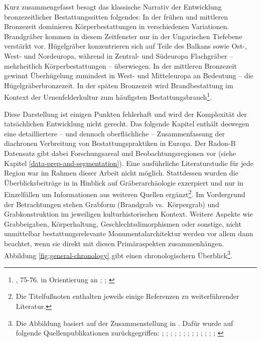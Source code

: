 \documentclass[openany,twoside,twocolumn]{book}
\let\rmarkdownfootnote\footnote%
\def\footnote{\protect\rmarkdownfootnote}
\begin{document}
Kurz zusammengefasst besagt das klassische Narrativ der Entwicklung
bronzezeitlicher Bestattungssitten folgendes: In der frühen und
mittleren Bronzezeit dominieren Körperbestattungen in verschiedenen
Variationen. Brandgräber kommen in diesem Zeitfenster nur in der
Ungarischen Tiefebene verstärkt vor. Hügelgräber konzentrieren sich auf
Teile des Balkans sowie Ost-, West- und Nordeuropa, während in Zentral-
und Südeuropa Flachgräber -- mehrheitlich Körperbestattungen --
überwiegen. In der mittleren Bronzezeit gewinnt Überhügelung zumindest
in West- und Mitteleuropa an Bedeutung -- die Hügelgräberbronzezeit. In
der späten Bronzezeit wird Brandbestattung im Kontext der
Urnenfelderkultur zum häufigsten Bestattungsbrauch\footnote{\textcite{harding_european_2000},
  75-76. in Orientierung an \textcite{hausler_bestattungssitten_1977};
  \textcite{hausler_grab-_1994};
  \textcite{hausler_totenorientierung_1996}}.

Diese Darstellung ist einigen Punkten fehlerhaft und wird der
Komplexität der tatsächlichen Entwicklung nicht gerecht. Das folgende
Kapitel enthält deswegen eine detailliertere -- und dennoch
oberflächliche -- Zusammenfassung der diachronen Verbreitung von
Bestattungspraktiken in Europa. Der Radon-B Datensatz gibt dabei
Forschungsareal und Beobachtungsregionen vor (siehe Kapitel
\ref{data-prep-and-segmentation}). Eine ausführliche Literaturstudie für
jede Region war im Rahmen dieser Arbeit nicht möglich. Stattdessen
wurden die Überblicksbeiträge in \textcite{fokkens_oxford_2013} in
Hinblick auf Gräberarchäologie exzerpiert und nur in Einzelfällen um
Informationen aus weiteren Quellen ergänzt\footnote{Die Titelfußnoten
  enthalten jeweils einige Referenzen zu weiterführender Literatur.}. Im
Vordergrund der Betrachtungen stehen Grabform (Brandgrab vs.~Körpergrab)
und Grabkonstruktion im jeweiligen kulturhistorischen Kontext. Weitere
Aspekte wie Grabbeigaben, Körperhaltung, Geschlechtsdimorphismen oder
sonstige, nicht unmittelbar bestattungsrelevante Monumentalarchitektur
werden vor allem dann beachtet, wenn sie direkt mit diesen
Primäraspekten zusammenhängen. Abbildung \ref{fig:general-chronology}
gibt einen chronologischern Überblick\footnote{Die Abbildung basiert auf
  der Zusammenstellung in \textcite{roberts_old_2013}. Dafür wurde auf
  folgende Quellenpublikationen zurückgegriffen:
  \textcite{arnoldussen_bronze_2008}; \textcite{bourgeois_lage_2005};
  \textcite{burgess_bronze_1974}; \textcite{burgess_age_1980};
  \textcite{brindley_dating_2007}; \textcite{eogan_accomplished_1994};
  \textcite{gerloff_reineckes_2007}; \textcite{gerloff_atlantic_2010};
  \textcite{de_laet_belgique_1982};
  \textcite{lanting_14c-chronologie_2001};
  \textcite{louwe_kooijmanns_prehistory_2005};
  \textcite{needham_chronology_1996};
  \textcite{needham_independent_1997}; \textcite{needham_first_2010}}.
\end{document}
